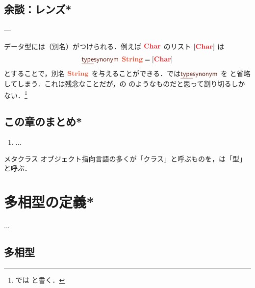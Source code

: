 \documentclass[a5paper,twoside,fleqn,draft]{jsbook}
\begin{document}
\section{余談：レンズ*}



---


データ型には（別名）がつけられる．例えば $\hChar$ のリスト $[\hChar]$ は
\begin{equation}
  \mTypeSynonymDecl\;
  \mStringType
  =[\hChar]
\end{equation}
とすることで，別名 $\mStringType$ を与えることができる．\haskell では$\mTypeSynonymDecl$ を  と省略してしまう．これは残念なことだが，\clang の  のようなものだと思って割り切るしかない．\footnote{\haskell では  と書く．}

\section{この章のまとめ*}

\begin{enumerate}
\item ...
\end{enumerate}

\begin{note}{メタクラス}
オブジェクト指向言語の多くが「クラス」と呼ぶものを，\haskell は「型」と呼ぶ．


\end{note}


\chapter{多相型の定義*}
\label{ch:polymorphic-data-type}
...

\section{多相型}
\end{document}
